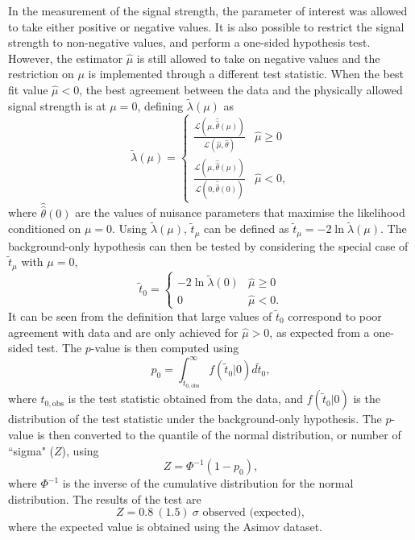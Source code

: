 In the measurement of the signal strength, the parameter of interest
was allowed to take either positive or negative values. It is also
possible to restrict the signal strength to non-negative values, and
perform a one-sided hypothesis test. However, the estimator $\hat\mu$
is still allowed to take on negative values and the restriction on
$\mu$ is implemented through a different test statistic.
When the best fit value $\hat\mu < 0$, the best agreement between 
the data and the physically allowed signal strength is at $\mu = 0$,
defining $\tilde\lambda(\mu)$ as
\begin{equation}
\tilde\lambda(\mu) = 
    \begin{cases}
     \frac{\mathcal{L}(\mu, \hat{\hat\theta}(\mu))}{\mathcal{L}(\hat\mu, \hat\theta)} & \hat\mu \geq 0 \\
     \frac{\mathcal{L}(\mu, \hat{\hat\theta}(\mu))}{\mathcal{L}(0, \hat{\hat\theta}(0))} & \hat\mu < 0,
    \end{cases}
\end{equation}
where $\hat{\hat\theta}(0)$ are the values of nuisance parameters
that maximise the likelihood conditioned on $\mu=0$. Using $\tilde\lambda(\mu)$,
$\tilde{t}_\mu$ can be defined as $\tilde{t}_\mu = -2 \ln{\tilde\lambda(\mu)}$.
The background-only hypothesis can then be tested by considering the
special case of $\tilde{t}_\mu$ with $\mu=0$,
\begin{equation}
\tilde t_0 =
    \begin{cases}
     -2\ln{\tilde\lambda(0)} & \hat\mu \geq 0 \\
     0                       & \hat\mu < 0.
    \end{cases}
\end{equation}
It can be seen from the definition that large values of $\tilde t_0$
correspond to poor agreement with data and are only achieved for
$\hat\mu > 0$, as expected from a one-sided test. The $p$-value is
then computed using
\begin{equation}
p_0 = \int_{\tilde t_{0, \text{obs}}}^{\infty} f(\tilde t_0 | 0) d \tilde t_0,
\end{equation}
where $t_{0, \text{obs}}$ is the test statistic obtained from the data,
and $f(\tilde t_0 | 0)$ is the distribution of the test statistic 
under the background-only hypothesis. The $p$-value is then converted
to the quantile of the normal distribution, or number of ``sigma" ($Z$),
using
\begin{equation}
Z = \Phi^{-1}(1-p_0),
\end{equation}
where $\Phi^{-1}$ is the inverse of the cumulative distribution for
the normal distribution. The results of the test are
\begin{equation}
Z = 0.8~(1.5)~\sigma \text{ observed (expected)},
\end{equation}
where the expected value is obtained using the Asimov dataset.

